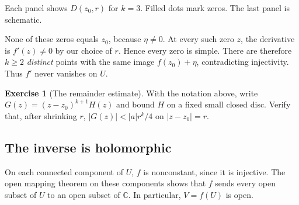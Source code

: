\documentclass[11pt]{article}
\theoremstyle{plain}
\theoremstyle{definition}
\newtheorem{exercise}[theorem]{Exercise}
\theoremstyle{boldremark}
\theoremstyle{remark}
\numberwithin{equation}{section}
\newcommand{\C}{\mathbb{C}}
\newenvironment{lecturefigure}
 {\par\addvspace{0.25em}\begingroup\setlength{\parskip}{0pt}\centering}
 {\par\endgroup\addvspace{0.25em}}
\begin{document}
\begin{lecturefigure}
\begin{minipage}{\linewidth}
\centering
{}
\par\smallskip
{\small Each panel shows $D(z_0,r)$ for $k=3$. Filled dots mark zeros.
The last panel is schematic.}
\end{minipage}
\end{lecturefigure}

None of these zeros equals $z_0$, because $\eta\ne0$. At every such zero
$z$, the derivative is $f'(z)\ne0$ by our choice of $r$. Hence every zero
is simple. There are therefore $k\geq2$ \emph{distinct} points with the
same image $f(z_0)+\eta$, contradicting injectivity. Thus $f'$ never
vanishes on $U$.


\begin{exercise}[The remainder estimate]
With the notation above, write $G(z)=(z-z_0)^{k+1}H(z)$ and bound $H$ on
a fixed small closed disc. Verify that, after shrinking $r$,
$|G(z)|<|a|r^k/4$ on $|z-z_0|=r$.
\end{exercise}

\subsection{The inverse is holomorphic}
On each connected component of $U$, $f$ is nonconstant, since it is
injective. The open mapping theorem on these components shows that
$f$ sends every open subset of $U$ to an open subset of $\C$. In
particular, $V=f(U)$ is open.
\end{document}
